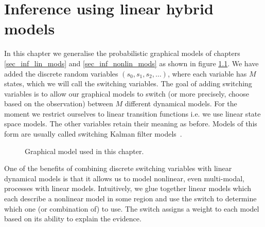 \chapter{Inference using linear hybrid models}
\label{sec_inf_lin_hybrid}
In this chapter we generalise the probabilistic graphical models of chapters \ref{sec_inf_lin_mods} and \ref{sec_inf_nonlin_mods} as shown in figure \ref{fig_hybridmod1}. We have added the discrete random variables $(s_0,s_1, s_2,\hdots)$, where each variable has $M$ states, which we will call the switching variables. The goal of adding switching variables is to allow our graphical models to switch (or more precisely, choose based on the observation) between $M$ different dynamical models. For the moment we restrict ourselves to linear transition functions i.e. we use linear state space models. The other variables retain their meaning as before. Models of this form are usually called switching Kalman filter models~\cite{murphy1}. 
\begin{figure}[H] 
\centering
{}
\caption{Graphical model used in this chapter.}
\label{fig_hybridmod1}
\end{figure}
One of the benefits of combining discrete switching variables with linear dynamical models is that it allows us to model nonlinear, even multi-modal, processes with linear models. Intuitively, we glue together linear models which each describe a nonlinear model in some region and use the switch to determine which one (or combination of) to use. The switch assigns a weight to each model based on its ability to explain the evidence. 

